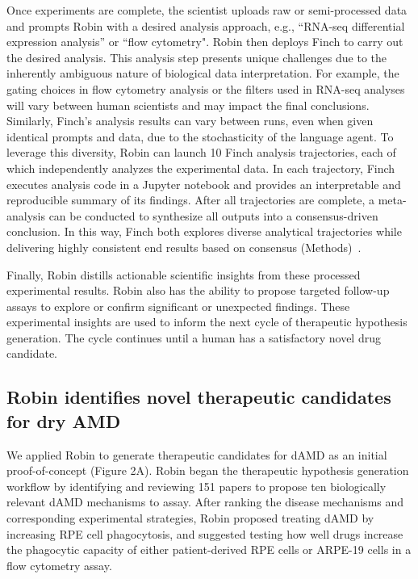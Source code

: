 \documentclass{article}
\begin{document}
Once experiments are complete, the scientist uploads raw or semi-processed data and prompts Robin with a desired analysis approach, e.g., “RNA-seq differential expression analysis” or “flow cytometry". Robin then deploys Finch to carry out the desired analysis. This analysis step presents unique challenges due to the inherently ambiguous nature of biological data interpretation. For example, the gating choices in flow cytometry analysis or the filters used in RNA-seq analyses will vary between human scientists and may impact the final conclusions. Similarly, Finch's analysis results can vary between runs, even when given identical prompts and data, due to the stochasticity of the language agent. To leverage this diversity, Robin can launch 10 Finch analysis trajectories, each of which independently analyzes the experimental data. In each trajectory, Finch executes analysis code in a Jupyter notebook and provides an interpretable and reproducible summary of its findings. After all trajectories are complete, a meta-analysis can be conducted to synthesize all outputs into a consensus-driven conclusion. In this way, Finch both explores diverse analytical trajectories while delivering highly consistent end results based on consensus (Methods)~\cite{Narayanan_Braza_Griffiths_Ponnapati_Bou_Laurent_Kabeli_Wellawatte_Cox_Rodriques_et}.  

Finally, Robin distills actionable scientific insights from these processed experimental results. Robin also has the ability to propose targeted follow-up assays to explore or confirm significant or unexpected findings. These experimental insights are used to inform the next cycle of therapeutic hypothesis generation. The cycle continues until a human has a satisfactory novel drug candidate. 


\subsection{Robin identifies novel therapeutic candidates for dry AMD}

We applied Robin to generate therapeutic candidates for dAMD as an initial proof-of-concept (Figure 2A). Robin began the therapeutic hypothesis generation workflow by identifying and reviewing 151 papers to propose ten biologically relevant dAMD mechanisms to assay. After ranking the disease mechanisms and corresponding experimental strategies, Robin proposed treating dAMD by increasing RPE cell phagocytosis, and suggested testing how well drugs increase the phagocytic capacity of either patient-derived RPE cells or ARPE-19 cells in a flow cytometry assay. 
\end{document}
